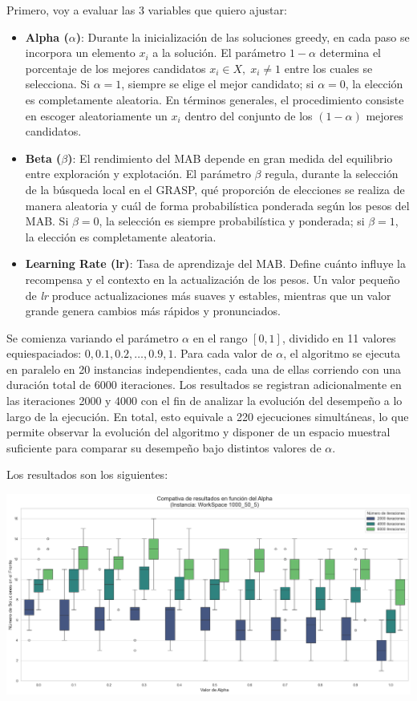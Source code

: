 \documentclass[12pt,a4paper]{book}
\begin{document}
Primero, voy a evaluar las 3 variables que quiero ajustar:
\begin{itemize}
    \item \textbf{Alpha ($\alpha$)}: Durante la inicialización de las soluciones greedy, en cada paso se incorpora un elemento $x_i$ a la solución. El parámetro $1-\alpha$ determina el porcentaje de los mejores candidatos $x_i \in X, \; x_i \neq 1$ entre los cuales se selecciona.  
Si $\alpha = 1$, siempre se elige el mejor candidato; si $\alpha = 0$, la elección es completamente aleatoria. En términos generales, el procedimiento consiste en escoger aleatoriamente un $x_i$ dentro del conjunto de los $(1-\alpha)$ mejores candidatos.
    \item \textbf{Beta ($\beta$)}: El rendimiento del MAB depende en gran medida del equilibrio entre exploración y explotación. El parámetro $\beta$ regula, durante la selección de la búsqueda local en el GRASP, qué proporción de elecciones se realiza de manera aleatoria y cuál de forma probabilística ponderada según los pesos del MAB.  
Si $\beta = 0$, la selección es siempre probabilística y ponderada; si $\beta = 1$, la elección es completamente aleatoria.
    \item \textbf{Learning Rate (lr)}: Tasa de aprendizaje del MAB. Define cuánto influye la recompensa y el contexto en la actualización de los pesos. 
Un valor pequeño de \textit{lr} produce actualizaciones más suaves y estables, mientras que un valor grande genera cambios más rápidos y pronunciados.
\end{itemize}

Se comienza variando el parámetro $\alpha$ en el rango $[0,1]$, dividido en 11 valores equiespaciados: $0, 0.1, 0.2, \dots, 0.9, 1$.  
Para cada valor de $\alpha$, el algoritmo se ejecuta en paralelo en 20 instancias independientes, cada una de ellas corriendo con una duración total de 6000 iteraciones. Los resultados se registran adicionalmente en las iteraciones 2000 y 4000 con el fin de analizar la evolución del desempeño a lo largo de la ejecución.
En total, esto equivale a 220 ejecuciones simultáneas, lo que permite observar la evolución del algoritmo y disponer de un espacio muestral suficiente para comparar su desempeño bajo distintos valores de $\alpha$.

Los resultados son los siguientes:

\includegraphics[width=\linewidth]{images_finetuning/alpha}
\end{document}
